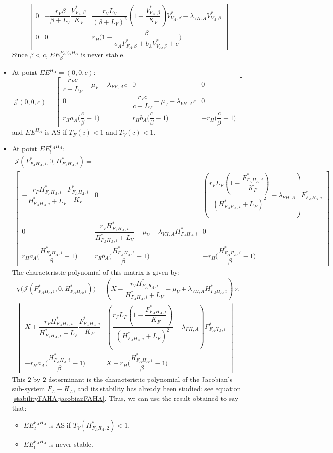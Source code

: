 \documentclass{article}
\newcommand{\lfa}{\lambda_{FH, A}}
\newcommand{\lva}{\lambda_{VH, A}}
\begin{document}
\begin{itemize}
\[\begin{bmatrix}
0 & -\dfrac{r_V \beta}{\beta + L_V}\dfrac{V^*_{V_A, \beta}}{K_V} & \dfrac{r_V L_V}{(\beta+L_V)^2}\left(1-\dfrac{V^*_{V_A, \beta}}{K_V}\right)V^*_{V_A, \beta}  - \lva V^*_{V_A, \beta} \\
0 & 0 & r_H \Big(1-\dfrac{\beta}{a_AF^*_{F_A, \beta} + b_AV^*_{V_A, \beta} + c}\Big)
\end{bmatrix}
\]
Since $\beta < c$, $EE^{F_AV_AH_A}_\beta$ is never stable.
\item At point $EE^{H_A} = (0, 0, c)$:
\[
\mathcal{J}(0,0,c) = \begin{bmatrix}
\dfrac{r_F c}{c + L_F} - \mu_F - \lfa c & 0 & 0\\
0 &\dfrac{r_V c}{c + L_V} - \mu_V - \lva c & 0\\
r_H a_A \Big(\dfrac{c}{\beta}-1\Big) & r_H b_A \Big(\dfrac{c}{\beta}-1\Big) & -r_H \Big(\dfrac{c}{\beta}-1\Big)
\end{bmatrix}
\]
and $EE^{H_A}$ is AS if $T_F(c) < 1$ and $T_V(c) < 1$.
\item At point $EE^{F_AH_A}_i$:
\begin{multline*}
\mathcal{J}(F^*_{F_AH_A, i},0,H^*_{F_AH_A, i}) = \\ \begin{bmatrix}
-\dfrac{r_F H^*_{F_AH_A, i}}{H^*_{F_AH_A, i} + L_F}\dfrac{F^*_{F_AH_A, i}}{K_F} & 0 & \left(\dfrac{r_F L_F \left(1-\dfrac{F^*_{F_AH_A, i}}{K_F}\right)}{(H^*_{F_AH_A, i}+L_F)^2}  - \lfa\right) F^*_{F_AH_A, i} \\
0 &\dfrac{r_V H^*_{F_AH_A, i}}{H^*_{F_AH_A, i} + L_V} - \mu_V - \lva H^*_{F_AH_A, i} & 0\\ 
 r_H a_A \Big(\dfrac{H^*_{F_AH_A, i}}{\beta}-1\Big) & r_H b_A \Big(\dfrac{H^*_{F_AH_A, i}}{\beta}-1\Big) & -r_H \Big(\dfrac{H^*_{F_AH_A, i}}{\beta}-1\Big)
\end{bmatrix}
\end{multline*}
The characteristic polynomial of this matrix is given by:
\begin{multline}
\chi\Big(\mathcal{J}(F^*_{F_AH_A, i},0,H^*_{F_AH_A, i})\Big) = \left(X - \dfrac{r_V H^*_{F_AH_A, i}}{H^*_{F_AH_A, i} + L_V} + \mu_V + \lva H^*_{F_AH_A, i}\right) \times \\
\begin{vmatrix}
X + \dfrac{r_F H^*_{F_AH_A, i}}{H^*_{F_AH_A, i} + L_F}\dfrac{F^*_{F_AH_A, i}}{K_F} & \left(\dfrac{r_F L_F \left(1-\dfrac{F^*_{F_AH_A, i}}{K_F}\right)}{(H^*_{F_AH_A, i}+L_F)^2}  - \lfa\right) F^*_{F_AH_A, i} \\
 -r_H a_A \Big(\dfrac{H^*_{F_AH_A, i}}{\beta}-1\Big) & X + r_H \Big(\dfrac{H^*_{F_AH_A, i}}{\beta}-1\Big)
\end{vmatrix}
\end{multline}
This 2 by 2 determinant is the characteristic polynomial of the Jacobian's sub-system $F_A-H_A$, and its stability has already been studied: see equation \eqref{stabilityFAHA:jacobianFAHA}.
Thus, we can use the result obtained to say that:
\begin{itemize}
\item $EE^{F_AH_A}_2$ is AS if $T_V(H^*_{F_AH_A, 2}) < 1$.
\item $EE^{F_AH_A}_1$ is never stable.
\end{itemize}
 


\end{itemize}
\end{document}

